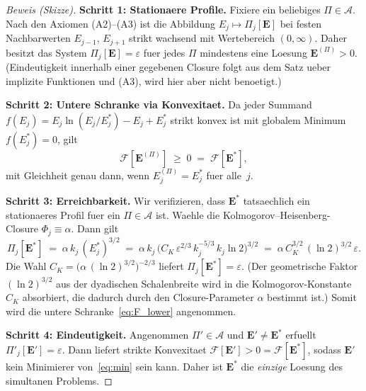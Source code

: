 \documentclass[12pt,a4paper]{article}
\theoremstyle{definition}
\theoremstyle{plain}
\theoremstyle{remark}
\begin{document}
\begin{proof}[Beweis (Skizze)]
\textbf{Schritt 1: Stationaere Profile.}\;
Fixiere ein beliebiges $\Pi \in \mathscr{A}$. Nach den Axiomen (A2)--(A3)
ist die Abbildung $E_j \mapsto \Pi_j[\mathbf{E}]$ bei festen
Nachbarwerten $E_{j-1},\,E_{j+1}$ strikt wachsend mit Wertebereich
$(0,\infty)$.
Daher besitzt das System $\Pi_j[\mathbf{E}] = \varepsilon$ fuer jedes
$\Pi$ mindestens eine Loesung $\mathbf{E}^{(\Pi)} > 0$. (Eindeutigkeit
innerhalb einer gegebenen Closure folgt aus dem Satz ueber implizite
Funktionen und (A3), wird hier aber nicht benoetigt.)

\textbf{Schritt 2: Untere Schranke via Konvexitaet.}\;
Da jeder Summand $f(E_j) = E_j\ln(E_j/E_j^*) - E_j + E_j^*$ strikt
konvex ist mit globalem Minimum $f(E_j^*) = 0$, gilt
\begin{equation}\label{eq:F_lower}
  \mathcal{F}[\mathbf{E}^{(\Pi)}]
  \;\ge\; 0
  \;=\; \mathcal{F}[\mathbf{E}^*],
\end{equation}
mit Gleichheit genau dann, wenn $E_j^{(\Pi)} = E_j^*$ fuer alle~$j$.

\textbf{Schritt 3: Erreichbarkeit.}\;
Wir verifizieren, dass $\mathbf{E}^*$ tatsaechlich ein stationaeres Profil
fuer ein $\Pi \in \mathscr{A}$ ist. Waehle die Kolmogorov--Heisenberg-Closure
$\Phi_j \equiv \alpha$. Dann gilt
\[
  \Pi_j[\mathbf{E}^*]
  \;=\; \alpha\,k_j\,(E_j^*)^{3/2}
  \;=\; \alpha\,k_j\,
    \bigl(C_K\,\varepsilon^{2/3}\,k_j^{-5/3}\,k_j\ln 2\bigr)^{3/2}
  \;=\; \alpha\,C_K^{3/2}\,(\ln 2)^{3/2}\,\varepsilon.
\]
Die Wahl $C_K = \bigl(\alpha\,(\ln 2)^{3/2}\bigr)^{-2/3}$ liefert
$\Pi_j[\mathbf{E}^*] = \varepsilon$. (Der geometrische Faktor $(\ln 2)^{3/2}$
aus der dyadischen Schalenbreite wird in die Kolmogorov-Konstante $C_K$
absorbiert, die dadurch durch den Closure-Parameter $\alpha$ bestimmt ist.)
Somit wird die untere Schranke~\eqref{eq:F_lower} angenommen.

\textbf{Schritt 4: Eindeutigkeit.}\;
Angenommen $\Pi' \in \mathscr{A}$ und $\mathbf{E}' \ne \mathbf{E}^*$ erfuellt
$\Pi'_j[\mathbf{E}'] = \varepsilon$. Dann liefert strikte Konvexitaet
$\mathcal{F}[\mathbf{E}'] > 0 = \mathcal{F}[\mathbf{E}^*]$, sodass
$\mathbf{E}'$ kein Minimierer von~\eqref{eq:min} sein kann. Daher ist
$\mathbf{E}^*$ die \emph{einzige} Loesung des simultanen Problems.


\end{proof}
\end{document}
